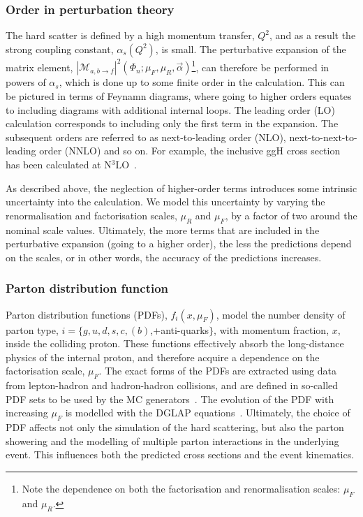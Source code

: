 \subsubsection{Order in perturbation theory}
The hard scatter is defined by a high momentum transfer, $Q^2$, and as a result the strong coupling constant, $\alpha_s(Q^2)$, is small. The perturbative expansion of the matrix element, $|\mathcal{M}_{a,b\rightarrow f}|^2(\Phi_n;\mu_F,\mu_R,\vec{\alpha})$\footnote{Note the dependence on both the factorisation and renormalisation scales: $\mu_F$ and $\mu_R$.}, can therefore be performed in powers of $\alpha_s$, which is done up to some finite order in the calculation. This can be pictured in terms of Feynamn diagrams,
where going to higher orders equates to including diagrams with additional internal loops. The leading order (LO) calculation corresponds to including only the first term in the expansion. The subsequent orders are referred to as next-to-leading order (NLO), next-to-next-to-leading order (NNLO) and so on. For example, the inclusive ggH cross section has been calculated at N$^{3}$LO~\cite{Anastasiou:2016cez}.

As described above, the neglection of higher-order terms introduces some intrinsic uncertainty into the calculation. We model this uncertainty by varying the renormalisation and factorisation scales, $\mu_R$ and $\mu_F$, by a factor of two around the nominal scale values.
Ultimately, the more terms that are included in the perturbative expansion (going to a higher order), the less the predictions depend on the scales, or in other words, the accuracy of the predictions increases.

\subsubsection{Parton distribution function}
Parton distribution functions (PDFs), $f_{i}(x,\mu_F)$, model the number density of parton type, $i=\{g,u,d,s,c,(b)$,+anti-quarks$\}$, with momentum fraction, $x$, inside the colliding proton. These functions effectively absorb the long-distance physics of the internal proton, and therefore acquire a dependence on the factorisation scale, $\mu_F$. The exact forms of the PDFs are extracted using data from lepton-hadron and hadron-hadron collisions, and are defined in so-called PDF sets to be used by the MC generators~\cite{Butterworth:2015oua}. The evolution of the PDF with increasing $\mu_F$ is modelled with the DGLAP equations~\cite{Gribov:1972ri,Dokshitzer:1977sg,Altarelli:1977zs}. Ultimately, the choice of PDF affects not only the simulation of the hard scattering, but also the parton showering and the modelling of multiple parton interactions in the underlying event. This influences both the predicted cross sections and the event kinematics.

